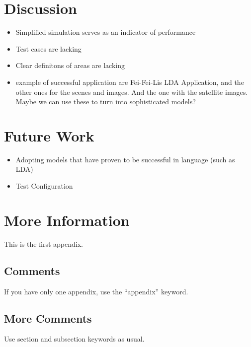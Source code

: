 \documentclass[twocolumn,letterpaper]{IEEEAerospaceCLS}  %
\begin{document}
\section{Discussion} \label{sec:Disc}
\begin{itemize}
    \item Simplified simulation serves as an indicator of performance
    \item Test cases are lacking
    \item Clear definitons of areas are lacking
    \item example of successful application are Fei-Fei-Lis LDA Application, and the other ones for the scenes and images. And the one with the satellite images. Maybe we can use these to turn into sophisticated models?
\end{itemize}

\section{Future Work} \label{sec:Fut}
\begin{itemize}
    \item Adopting models that have proven to be successful in language (such as LDA)
    \item Test Configuration
\end{itemize}
\appendices{}              %

\section{More Information}        %
This is the first appendix.

\subsection{Comments}
If you have only one appendix, use the ``appendix'' keyword.

\subsection{More Comments}
Use section and subsection keywords as usual.
\end{document}
